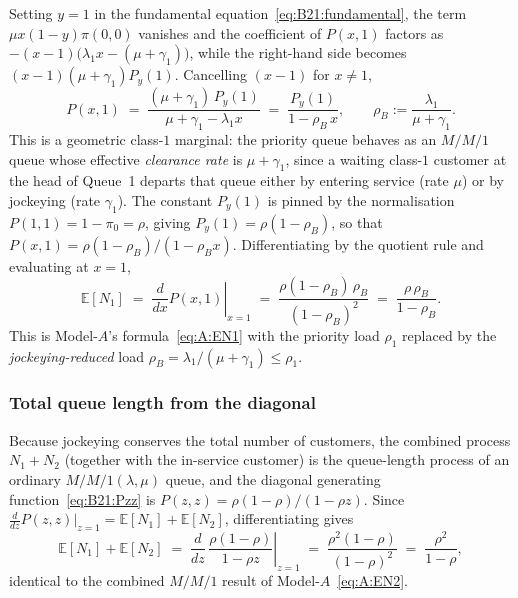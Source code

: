 \documentclass{article}
\numberwithin{equation}{section}
\begin{document}
Setting $y=1$ in the fundamental equation~\eqref{eq:B21:fundamental}, the term
$\mu x(1-y)\pi(0,0)$ vanishes and the coefficient of $P(x,1)$ factors as
$-(x-1)\bigl(\lambda_1 x-(\mu+\gamma_1)\bigr)$, while the right-hand side becomes
$(x-1)(\mu+\gamma_1)P_y(1)$. Cancelling $(x-1)$ for $x\ne1$,
\begin{equation}
    P(x,1) \;=\; \frac{(\mu+\gamma_1)\,P_y(1)}{\mu+\gamma_1-\lambda_1 x}
            \;=\; \frac{P_y(1)}{1-\rho_B\,x},
    \qquad \rho_B := \frac{\lambda_1}{\mu+\gamma_1}.
    \label{eq:B21:Px1}
\end{equation}
This is a geometric class-$1$ marginal: the priority queue behaves as an $M/M/1$ queue whose
effective \emph{clearance rate} is $\mu+\gamma_1$, since a waiting class-$1$ customer at the
head of Queue~1 departs that queue either by entering service (rate $\mu$) or by jockeying
(rate $\gamma_1$). The constant $P_y(1)$ is pinned by the normalisation
$P(1,1)=1-\pi_0=\rho$, giving $P_y(1)=\rho(1-\rho_B)$, so that
$P(x,1)=\rho(1-\rho_B)/(1-\rho_B x)$. Differentiating by the quotient rule and evaluating at
$x=1$,
\begin{equation}
    \mathbb{E}[N_1] \;=\; \left.\frac{d}{dx}P(x,1)\right|_{x=1}
    \;=\; \frac{\rho(1-\rho_B)\,\rho_B}{(1-\rho_B)^2}
    \;=\; \frac{\rho\,\rho_B}{1-\rho_B}.
    \label{eq:B21:EN1}
\end{equation}
This is Model-$A$'s formula~\eqref{eq:A:EN1} with the priority load $\rho_1$ replaced by the
\emph{jockeying-reduced} load $\rho_B=\lambda_1/(\mu+\gamma_1)\le\rho_1$.

\subsubsection{Total queue length from the diagonal}

Because jockeying conserves the total number of customers, the combined process
$N_1+N_2$ (together with the in-service customer) is the queue-length process of an ordinary
$M/M/1(\lambda,\mu)$ queue, and the diagonal generating
function~\eqref{eq:B21:Pzz} is $P(z,z)=\rho(1-\rho)/(1-\rho z)$. Since
$\tfrac{d}{dz}P(z,z)\big|_{z=1}=\mathbb{E}[N_1]+\mathbb{E}[N_2]$, differentiating gives
\begin{equation}
    \mathbb{E}[N_1]+\mathbb{E}[N_2]
    \;=\; \left.\frac{d}{dz}\,\frac{\rho(1-\rho)}{1-\rho z}\right|_{z=1}
    \;=\; \frac{\rho^2(1-\rho)}{(1-\rho)^2}
    \;=\; \frac{\rho^2}{1-\rho},
    \label{eq:B21:EN}
\end{equation}
identical to the combined $M/M/1$ result of Model-$A$~\eqref{eq:A:EN2}.
\end{document}
